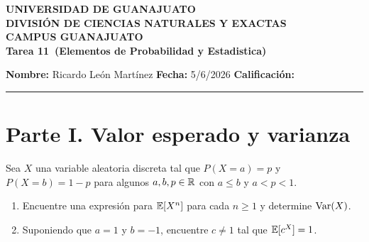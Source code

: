 \documentclass[12pt,a4paper]{article}
\newcommand{\alumno}{Ricardo León Martínez}
\newcommand{\materia}{Elementos de Probabilidad y Estadistica}
\newcommand{\tarea}{Tarea 11}
\newcommand{\fecha}{5/6/2026}
\begin{document}
    \begin{center}
        {\large\textbf{UNIVERSIDAD DE GUANAJUATO}}\\[0.3cm]
        {\normalsize\textbf{DIVISIÓN DE CIENCIAS NATURALES Y EXACTAS}}\\
        {\normalsize\textbf{CAMPUS GUANAJUATO}}\\[1cm]

        {\Large\textbf{\tarea\ (\materia)}}\\[1cm]
    \end{center}

    \noindent
    \textbf{Nombre:} \alumno 
    \hfill 
    \textbf{Fecha:} \fecha 
    \hfill 
    \textbf{Calificación:} \rule{3cm}{0.4pt}

    \vspace{0.3cm}

    \section*{Parte I. Valor esperado y varianza}

    \begin{mdframed}[style=mdpinkbox,frametitle={Ejercicio 1}]
        Sea $X$ una variable aleatoria discreta tal que $P(X=a)=p$ y $P(X=b)=1-p$ para algunos $a,b,p\in\mathbb{R}$ con $a\leq b$
        y $a\lt p\lt1$.
        \begin{enumerate}
            \item[(a)] Encuentre una expresión para $\mathbb{E}[X^{n}]$ para cada $n\geq1$ y determine $\operatorname{Var}(X)$.
            \item[(b)] Suponiendo que $a=1$ y $b=-1$, encuentre $c\neq1$ tal que $\mathbb{E}[c^{X}]=1$. 
        \end{enumerate}
    \end{mdframed}
\end{document}
